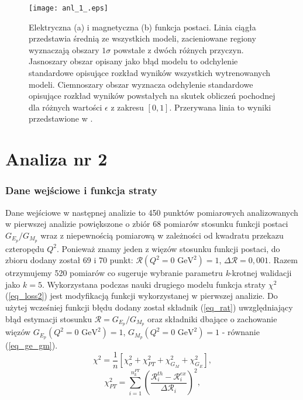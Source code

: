 \documentclass[11pt]{book}
\theoremstyle{definition}
\begin{document}
%
\begin{figure}[htp!]
	\centering
	\texttt{[image: anl\_1\_.eps]}
	\caption{Elektryczna (a) i magnetyczna (b) funkcja postaci. Linia ciągła przedstawia średnią ze wszystkich modeli, zacieniowane regiony wyznaczają obszary $1\sigma$ powstałe z dwóch różnych przyczyn. Jasnoszary obszar opisany jako błąd modelu to odchylenie standardowe opisujące rozkład wyników wszystkich wytrenowanych modeli. Ciemnoszary obszar wyznacza odchylenie standardowe opisujące rozkład wyników powstałych na skutek obliczeń pochodnej dla różnych wartości $\epsilon$ z zakresu $[0,1]$. Przerywana linia to wyniki przedstawione w \cite{2009PhRvC..79f5204A}.}
	\label{fig:ff1}
\end{figure}

\newpage

\section{Analiza nr 2}
\subsubsection{Dane wejściowe i funkcja straty}
%
Dane wejściowe w następnej analizie to 450 punktów pomiarowych analizowanych w pierwszej analizie powiększone o zbiór 68 pomiarów stosunku funkcji postaci $G_{E_p}/G_{M_p}$ wraz z niepewnością pomiarową w zależności od kwadratu przekazu czteropędu $Q^2$. Ponieważ znamy jeden z więzów stosunku funkcji postaci, do zbioru dodany został 69 i 70 punkt: $\mathcal{R}\left(Q^2 = 0 \text{ GeV}^2\right) = 1$, $\Delta \mathcal{R} = 0,001$. Razem otrzymujemy 520 pomiarów co sugeruje wybranie parametru \textit{k}-krotnej walidacji jako $k=5$.
%
Wykorzystana podczas nauki drugiego modelu funkcja straty $\chi^2$ (\ref{eq_loss2}) jest modyfikacją funkcji wykorzystanej w pierwszej analizie. Do użytej wcześniej funkcji błędu dodany został składnik (\ref{eq_rat}) uwzględniający błąd estymacji stosunku $\mathcal{R} = G_{E_p}/G_{M_p}$ oraz składniki dbające o zachowanie więzów $G_{E_p}\left(Q^2=0\text{ GeV}^2\right) = 1$, $G_{M_p}\left(Q^2=0\text{ GeV}^2\right) = 1$ - równanie (\ref{eq_ge_gm}).
%
\begin{equation}
\chi^2 = \frac{1}{n} \left[ \chi_{\sigma}^2 + \chi_{PT}^2 + \chi_{G_M}^2  + \chi_{G_E}^2  \right], \label{eq_loss2}
\end{equation}
%
\begin{equation}
\chi_{PT}^2 = \sum_{i=1}^{n_k^{PT}} \left( \frac{\mathcal{R}_i^{th} - \mathcal{R}_i^{ex}}{\Delta \mathcal{R}_{i}} \right)^2, \label{eq_rat}
\end{equation}
\end{document}
